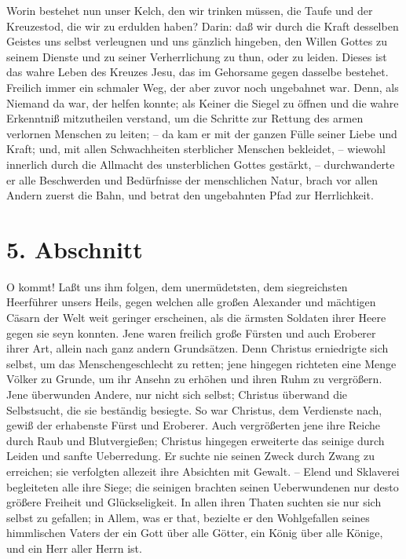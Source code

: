 Worin bestehet nun unser Kelch, den wir trinken müssen, die Taufe und der
Kreuzestod, die wir zu erdulden haben? Darin: daß wir durch die Kraft desselben
Geistes uns selbst verleugnen und uns gänzlich hingeben, den Willen Gottes zu
seinem Dienste und zu seiner Verherrlichung zu thun, oder zu leiden. Dieses ist
das wahre Leben des Kreuzes Jesu, das im Gehorsame gegen dasselbe bestehet.
Freilich immer ein schmaler Weg, der aber zuvor noch ungebahnet war. Denn, als
Niemand da war, der helfen konnte; als Keiner die Siegel zu öffnen und die wahre
Erkenntniß mitzutheilen verstand, um die Schritte zur Rettung des armen
verlornen Menschen zu leiten; -- da kam er mit der ganzen Fülle seiner Liebe und
Kraft; und, mit allen Schwachheiten sterblicher Menschen bekleidet, -- wiewohl
innerlich durch die Allmacht des unsterblichen Gottes gestärkt, -- durchwanderte
er alle Beschwerden und Bedürfnisse der menschlichen Natur, brach vor allen
Andern zuerst die Bahn, und betrat den ungebahnten Pfad zur Herrlichkeit.

\section{5. Abschnitt} \label{kap4_ab5}

O kommt! Laßt uns ihm folgen, dem unermüdetsten, dem siegreichsten Heerführer
unsers Heils, gegen welchen alle großen Alexander und mächtigen Cäsarn der Welt
weit geringer erscheinen, als die ärmsten Soldaten ihrer Heere gegen sie seyn
konnten. Jene waren freilich große Fürsten und auch Eroberer ihrer Art, allein
nach ganz andern Grundsätzen. Denn Christus erniedrigte sich selbst, um das
Menschengeschlecht zu retten; jene hingegen richteten eine Menge Völker zu
Grunde, um ihr Ansehn zu erhöhen und ihren Ruhm zu vergrößern. Jene überwunden
Andere, nur nicht sich selbst; Christus überwand die Selbstsucht, die sie
beständig besiegte. So war Christus, dem Verdienste nach, gewiß der erhabenste
Fürst und Eroberer. Auch vergrößerten jene ihre Reiche durch Raub und
Blutvergießen; Christus hingegen erweiterte das seinige durch Leiden und sanfte
Ueberredung. Er suchte nie seinen Zweck durch Zwang zu erreichen; sie verfolgten
allezeit ihre Absichten mit Gewalt. -- Elend und Sklaverei begleiteten alle ihre
Siege; die seinigen brachten seinen Ueberwundenen nur desto größere Freiheit und
Glückseligkeit. In allen ihren Thaten suchten sie nur sich selbst zu gefallen;
in Allem, was er that, bezielte er den Wohlgefallen seines himmlischen Vaters
der ein Gott über alle Götter, ein König über alle Könige, und ein Herr aller
Herrn ist.

